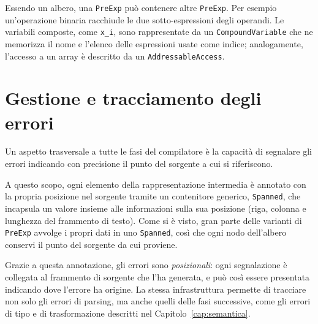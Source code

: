 Essendo un albero, una \texttt{PreExp} può contenere altre \texttt{PreExp}. 
Per esempio un'operazione binaria racchiude le due sotto-espressioni degli operandi. Le
variabili composte, come \texttt{x\_i}, sono rappresentate da un
\texttt{CompoundVariable} che ne memorizza il nome e l'elenco delle espressioni
usate come indice; analogamente, l'accesso a un array è descritto da un
\texttt{AddressableAccess}.

\section{Gestione e tracciamento degli errori}
\label{sec:errori-parsing}

Un aspetto trasversale a tutte le fasi del compilatore è la capacità di
segnalare gli errori indicando con precisione il punto del sorgente a cui si
riferiscono.

A questo scopo, ogni elemento della rappresentazione intermedia è annotato con
la propria posizione nel sorgente tramite un contenitore generico,
\texttt{Spanned}, che incapsula un valore insieme alle informazioni sulla sua
posizione (riga, colonna e lunghezza del frammento di testo). Come si è visto,
gran parte delle varianti di \texttt{PreExp} avvolge i propri dati in uno
\texttt{Spanned}, così che ogni nodo dell'albero conservi il punto del sorgente
da cui proviene.

Grazie a questa annotazione, gli errori sono \emph{posizionali}: ogni
segnalazione è collegata al frammento di sorgente che l'ha generata, e può così
essere presentata indicando dove l'errore ha origine. La stessa infrastruttura
permette di tracciare non solo gli errori di parsing, ma anche quelli delle fasi
successive, come gli errori di tipo e di trasformazione descritti nel
Capitolo~\ref{cap:semantica}.
